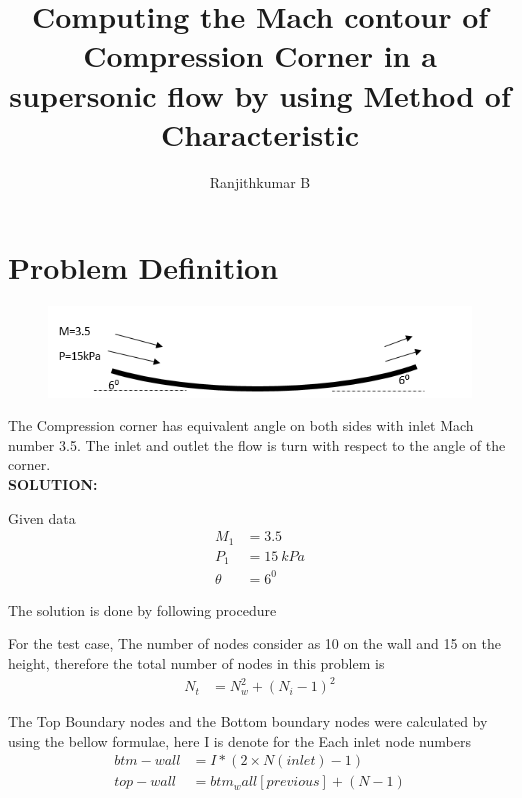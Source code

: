 \documentclass[conf]{new-aiaa}
\title{Computing the Mach contour of Compression Corner in a supersonic flow by using Method of Characteristic}
\author{Ranjithkumar B}
\begin{document}
\maketitle

\section{Problem Definition}

\begin{figure}[!h]
	\centering
	\includegraphics[scale=0.5]{results/question.png}
\end{figure}

\par The Compression corner has equivalent angle on both sides with inlet Mach number 3.5. The inlet and outlet the flow is turn with respect to the angle of the corner.\\

\textbf{SOLUTION:}\\

\par Given data
\begin{align*}
	M_1 &= 3.5 \\
	P_1 &= 15 \ kPa \\
	\theta & = 6^0
\end{align*}

\par The solution is done by following procedure\\

\par For the test case, The number of nodes consider as 10 on the wall and 15 on the height, therefore the total number of nodes in this problem is  \\
\begin{align*}
	N_{t} & = N_w^2+(N_i-1)^2
\end{align*}
\par The Top Boundary nodes and the Bottom boundary nodes were calculated by using the bellow formulae, here I is denote for the Each inlet node numbers
\begin{align*}
	btm-wall & = I*(2 \times N(inlet)-1) \\
	top-wall & = btm_wall[previous] + (N -1) \\
\end{align*}
\end{document}
